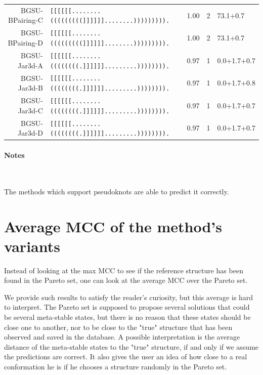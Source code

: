 \documentclass{article}
\begin{document}
{\begin{tabular}{rlccl}
BGSU-BPairing-C      &        \texttt{[[[[[[........(((((((((]]]]]]........))))))))).} & 1.00  &  2    &   73.1+0.7\\
BGSU-BPairing-D      &        \texttt{[[[[[[........(((((((((]]]]]]........))))))))).} & 1.00  &  2    &   73.1+0.7\\
BGSU-Jar3d-A    &        \texttt{[[[[[[........((((((((.]]]]]].........)))))))).} & 0.97  &  1    &   0.0+1.7+0.7\\
BGSU-Jar3d-B    &        \texttt{[[[[[[........((((((((.]]]]]].........)))))))).} & 0.97  &  1    &   0.0+1.7+0.8\\
BGSU-Jar3d-C    &        \texttt{[[[[[[........((((((((.]]]]]].........)))))))).} & 0.97  &  1    &   0.0+1.7+0.7\\
BGSU-Jar3d-D    &        \texttt{[[[[[[........((((((((.]]]]]].........)))))))).} & 0.97  &  1    &   0.0+1.7+0.7\\
\end{tabular}}


\paragraph{Notes} ~

The methods which support pseudoknots are able to predict it correctly.

\newpage
\section{Average MCC of the method's variants}
Instead of looking at the max MCC to see if the reference structure has been found in the Pareto set, one can look at the average MCC over the Pareto set.

We provide such results to satisfy the reader's curiosity, but this average is hard to interpret. 
The Pareto set is supposed to propose several solutions that could be several meta-stable states, but there is no reason that these states should be close one to another, nor to be close to the "true" structure that has been observed and saved in the database.
A possible interpretation is the average distance of the meta-stable states to the "true" structure, if and only if we assume the predictions are correct.
It also gives the user an idea of how close to a real conformation he is if he chooses a structure randomly in the Pareto set.
\end{document}
